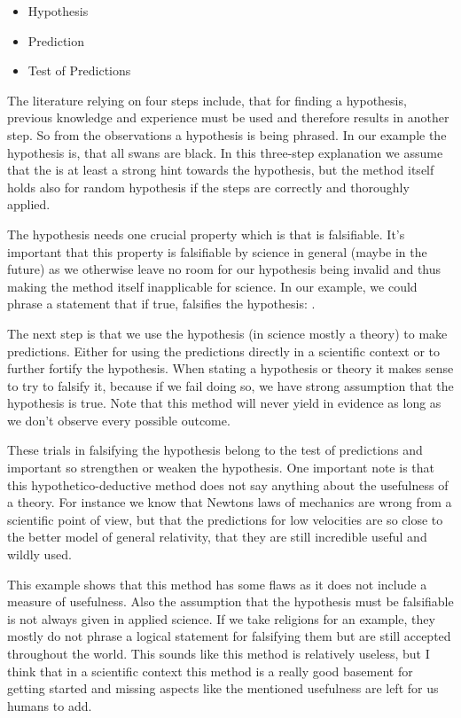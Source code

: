 \documentclass[11pt]{scrartcl}
\begin{document}
\begin{itemize}
  \item Hypothesis
  \item Prediction
  \item Test of Predictions
\end{itemize}

The literature relying on four steps include, that for finding a hypothesis, previous knowledge and experience must be used and therefore results in another step. So from the observations a hypothesis is being phrased. In our example the hypothesis is, that all swans are black. In this three-step explanation we assume that the is at least a strong hint towards the hypothesis, but the method itself holds also for random hypothesis if the steps are correctly and thoroughly applied.

The hypothesis needs one crucial property which is that is falsifiable. It's important that this property is falsifiable by science in general (maybe in the future) as we otherwise leave no room for our hypothesis being invalid and thus making the method itself inapplicable for science. In our example, we could phrase a statement that if true, falsifies the hypothesis: .

The next step is that we use the hypothesis (in science mostly a theory) to make predictions. Either for using the predictions directly in a scientific context or to further fortify the hypothesis. When stating a hypothesis or theory it makes sense to try to falsify it, because if we fail doing so, we have strong assumption that the hypothesis is true. Note that this method will never yield in evidence as long as we don't observe every possible outcome.

These trials in falsifying the hypothesis belong to the test of predictions and important so strengthen or weaken the hypothesis. One important note is that this hypothetico-deductive method does not say anything about the usefulness of a theory. For instance we know that Newtons laws of mechanics are wrong from a scientific point of view, but that the predictions for low velocities are so close to the better model of general relativity, that they are still incredible useful and wildly used.

This example shows that this method has some flaws as it does not include a measure of usefulness. Also the assumption that the hypothesis must be falsifiable is not always given in applied science. If we take religions for an example, they mostly do not phrase a logical statement for falsifying them but are still accepted throughout the world. This sounds like this method is relatively useless, but I think that in a scientific context this method is a really good basement for getting started and missing aspects like the mentioned usefulness are left for us humans to add.
\end{document}
